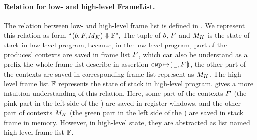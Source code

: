 \paragraph{\bf Relation for low- and high-level FrameList.} 
The relation between low- and high-level frame list is defined in 
\Fig{\ref{fig:relation-low-high-level-framelist}}. We represent 
this relation as form 
``${(b, F, M_K)} \Downarrow {\mathbb{F}}$", 
The tuple of $b$, 
$F$ and $M_K$ is the state of stack in low-level program, 
because, in the low-level program, part of the produces' contexts are 
saved in frame list $F$, which can also be understand as a 
prefix the whole frame list describe in assertion $\texttt{cwp}\!\mapsto\!\llparenthesis\, \underline{\ \,},F\,\rrparenthesis$, 
the other part of the contexts are saved in corresponding frame list 
represent as $M_K$. The high-level frame list $\mathbb{F}$ represents the 
state of stack in high-level program. 
\Fig{\ref{fig:Abstraction of Register Windows and Memory}} gives a 
more intuition understanding of this relation. Here, some part of 
the contexts $F$ (the pink part in the left side of the 
\Fig{\ref{fig:Abstraction of Register Windows and Memory}}) 
are saved in register windows, and the other part of contexts 
$M_K$ (the green part in the left side of the 
\Fig{\ref{fig:Abstraction of Register Windows and Memory}}) are 
saved in stack frame in memory. However, in high-level state, 
they are abstracted as list named high-level frame list $\mathbb{F}$. 
% 

